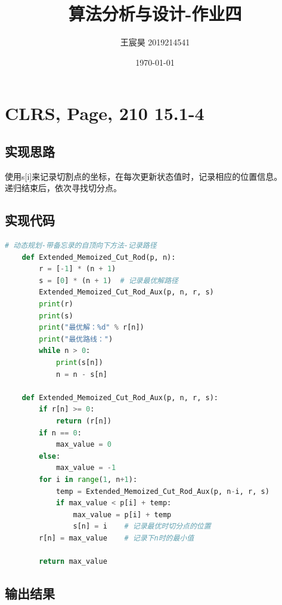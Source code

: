 \documentclass[UTF8]{ctexart}
\title{算法分析与设计-作业四}
\author{王宸昊 2019214541}
\date{\today}
\begin{document}
\maketitle


\section{CLRS, Page, 210 15.1-4}

\subsection{实现思路}

使用s[i]来记录切割点的坐标，在每次更新状态值时，记录相应的位置信息。\\
递归结束后，依次寻找切分点。\\

\subsection{实现代码}

\begin{lstlisting}[language={python}]
    # 动态规划-带备忘录的自顶向下方法-记录路径
    def Extended_Memoized_Cut_Rod(p, n):
        r = [-1] * (n + 1)
        s = [0] * (n + 1)  # 记录最优解路径
        Extended_Memoized_Cut_Rod_Aux(p, n, r, s)
        print(r)
        print(s)
        print("最优解：%d" % r[n])
        print("最优路线：")
        while n > 0:
            print(s[n])
            n = n - s[n]

    def Extended_Memoized_Cut_Rod_Aux(p, n, r, s):
        if r[n] >= 0:
            return (r[n])
        if n == 0:
            max_value = 0
        else:
            max_value = -1
        for i in range(1, n+1):
            temp = Extended_Memoized_Cut_Rod_Aux(p, n-i, r, s)
            if max_value < p[i] + temp:
                max_value = p[i] + temp
                s[n] = i    # 记录最优时切分点的位置
        r[n] = max_value    # 记录下n时的最小值
        
        return max_value
\end{lstlisting}

\subsection{输出结果}
\end{document}
